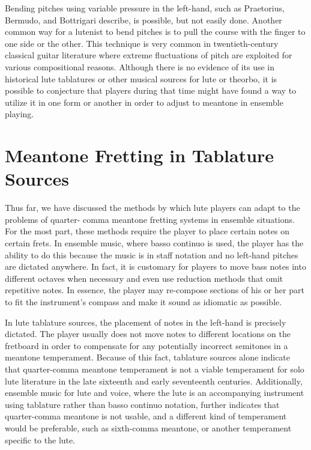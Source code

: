 Bending pitches using variable pressure in the left-hand, such as Praetorius, Bermudo, and
Bottrigari describe, is possible, but not easily done. Another common way for a lutenist to bend
pitches is to pull the course with the finger to one side or the other. This technique is very
common in twentieth-century classical guitar literature where extreme fluctuations of pitch are
exploited for various compositional reasons. Although there is no evidence of its use in historical
lute tablatures or other musical sources for lute or theorbo, it is possible to conjecture that
players during that time might have found a way to utilize it in one form or another in order to
adjust to meantone in ensemble playing.

\section{Meantone Fretting in Tablature Sources}

Thus far, we have discussed the methods by which lute players can adapt to the problems of quarter-
comma meantone fretting systems in ensemble situations.  For the most part, these methods require
the player to place certain notes on certain frets.  In ensemble music, where basso continuo is
used, the player has the ability to do this because the music is in staff notation and no left-hand
pitches are dictated anywhere.  In fact, it is customary for players to move bass notes into
different octaves when necessary and even use reduction methods that omit repetitive notes.  In
essence, the player may re-compose sections of his or her part to fit the instrument's compass and
make it sound as idiomatic as possible.

In lute tablature sources, the placement of notes in the left-hand is precisely dictated. The player
usually does not move notes to different locations on the fretboard in order to compensate for any
potentially incorrect semitones in a meantone temperament.  Because of this fact, tablature
sources alone indicate that quarter-comma meantone temperament is not a viable temperament for solo
lute literature in the late sixteenth and early seventeenth centuries. Additionally, ensemble music
for lute and voice, where the lute is an accompanying instrument using tablature rather than basso
continuo notation, further indicates that quarter-comma meantone is not usable, and a different kind
of temperament would be preferable, such as sixth-comma meantone, or another temperament specific to
the lute.

